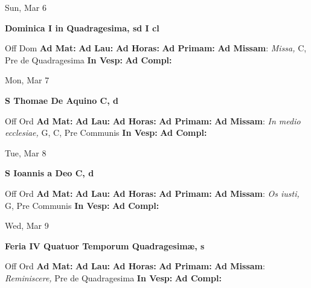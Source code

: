\documentclass[10pt]{article}
\begin{document}
\begin{minipage}{3.5in}
\vspace{2em}\begin{center}
Sun, Mar 6
\end{center}\textbf{ \large Dominica I in Quadragesima, \textnormal{\normalsize sd I cl}}
\begin{justify}
Off Dom
\textbf{Ad Mat: }
\textbf{Ad Lau: }
\textbf{Ad Horas: }
\textbf{Ad Primam: }
\textbf{Ad Missam}: \textit{Missa,} C, Pre de Quadragesima
\textbf{In Vesp: }
\textbf{Ad Compl: }\end{justify}
\end{minipage}



\begin{minipage}{3.5in}
\vspace{2em}\begin{center}
Mon, Mar 7
\end{center}\textbf{ \large S Thomae De Aquino C, \textnormal{\normalsize d}}
\begin{justify}
Off Ord
\textbf{Ad Mat: }
\textbf{Ad Lau: }
\textbf{Ad Horas: }
\textbf{Ad Primam: }
\textbf{Ad Missam}: \textit{In medio ecclesiae,} G, C, Pre Communis
\textbf{In Vesp: }
\textbf{Ad Compl: }\end{justify}
\end{minipage}



\begin{minipage}{3.5in}
\vspace{2em}\begin{center}
Tue, Mar 8
\end{center}\textbf{ \large S Ioannis a Deo C, \textnormal{\normalsize d}}
\begin{justify}
Off Ord
\textbf{Ad Mat: }
\textbf{Ad Lau: }
\textbf{Ad Horas: }
\textbf{Ad Primam: }
\textbf{Ad Missam}: \textit{Os iusti,} G, Pre Communis
\textbf{In Vesp: }
\textbf{Ad Compl: }\end{justify}
\end{minipage}



\begin{minipage}{3.5in}
\vspace{2em}\begin{center}
Wed, Mar 9
\end{center}\textbf{ \large Feria IV Quatuor Temporum Quadragesimæ, \textnormal{\normalsize s}}
\begin{justify}
Off Ord
\textbf{Ad Mat: }
\textbf{Ad Lau: }
\textbf{Ad Horas: }
\textbf{Ad Primam: }
\textbf{Ad Missam}: \textit{Reminiscere,} Pre de Quadragesima
\textbf{In Vesp: }
\textbf{Ad Compl: }\end{justify}
\end{minipage}
\end{document}
